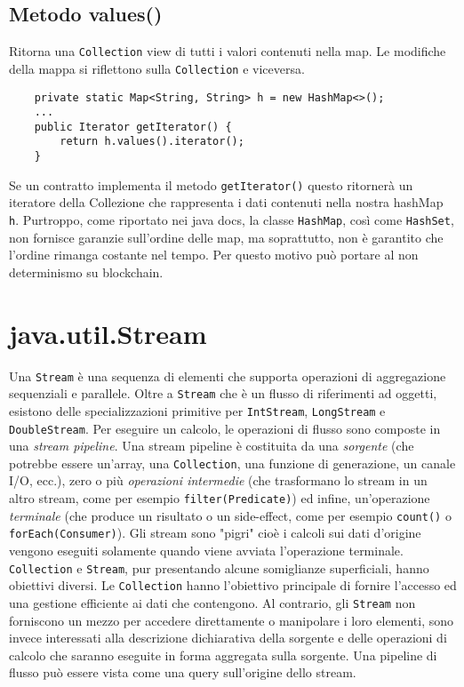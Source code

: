 		\subsection{Metodo values()}
			Ritorna una \lstinline|Collection| view di tutti i valori contenuti nella map. Le modifiche della mappa si riflettono sulla  \lstinline|Collection| e viceversa.
			\begin{lstlisting}
	private static Map<String, String> h = new HashMap<>();
	...
	public Iterator getIterator() { 
		return h.values().iterator();
	}
			\end{lstlisting}
			Se un contratto implementa il metodo \lstinline|getIterator()| questo ritornerà un iteratore della Collezione che rappresenta i dati contenuti nella nostra hashMap \lstinline|h|. Purtroppo, come riportato nei java docs, la classe \lstinline|HashMap|, così come \lstinline|HashSet|, non fornisce garanzie sull'ordine delle map, ma soprattutto, non è garantito che l'ordine rimanga costante nel tempo. Per questo motivo può portare al non determinismo su blockchain.
			
	\section{java.util.Stream}
		Una \lstinline|Stream| è una sequenza di elementi che supporta operazioni di aggregazione sequenziali e parallele. Oltre a \lstinline|Stream| che è un flusso di riferimenti ad oggetti, esistono delle specializzazioni primitive per \lstinline|IntStream|, \lstinline|LongStream| e \lstinline|DoubleStream|. Per eseguire un calcolo, le operazioni di flusso sono composte in una \textit{stream pipeline}. Una stream pipeline è costituita da una \textit{sorgente} (che potrebbe essere un'array, una \lstinline|Collection|, una funzione di generazione, un canale I/O, ecc.), zero o più \textit{operazioni intermedie} (che trasformano lo stream in un altro stream, come per esempio \lstinline|filter(Predicate)|) ed infine, un'operazione \textit{terminale} (che produce un risultato o un side-effect, come per esempio \lstinline|count()| o \lstinline|forEach(Consumer)|). Gli stream sono "pigri" cioè i calcoli sui dati d'origine vengono eseguiti solamente quando viene avviata l'operazione terminale.
		\lstinline|Collection| e \lstinline|Stream|, pur presentando alcune somiglianze superficiali, hanno obiettivi diversi. Le \lstinline|Collection| hanno l'obiettivo principale di fornire l'accesso ed una gestione efficiente ai dati che contengono. Al contrario, gli \lstinline|Stream| non forniscono un mezzo per accedere direttamente o manipolare i loro elementi, sono invece interessati alla descrizione dichiarativa della sorgente e delle operazioni di calcolo che saranno eseguite in forma aggregata sulla sorgente.	Una pipeline di flusso può essere vista come una query sull'origine dello stream.
		
